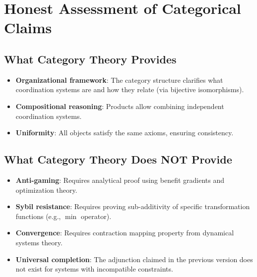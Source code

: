 \documentclass[11pt,a4paper]{article}
\theoremstyle{definition}
\theoremstyle{remark}
\begin{document}
\section{Honest Assessment of Categorical Claims}

\subsection{What Category Theory Provides}

\begin{itemize}
\item \textbf{Organizational framework}: The category structure clarifies what coordination systems are and how they relate (via bijective isomorphisms).

\item \textbf{Compositional reasoning}: Products allow combining independent coordination systems.

\item \textbf{Uniformity}: All objects satisfy the same axioms, ensuring consistency.
\end{itemize}

\subsection{What Category Theory Does NOT Provide}

\begin{itemize}
\item \textbf{Anti-gaming}: Requires analytical proof using benefit gradients and optimization theory.

\item \textbf{Sybil resistance}: Requires proving sub-additivity of specific transformation functions (e.g., $\min$ operator).

\item \textbf{Convergence}: Requires contraction mapping property from dynamical systems theory.

\item \textbf{Universal completion}: The adjunction claimed in the previous version does not exist for systems with incompatible constraints.
\end{itemize}
\end{document}
